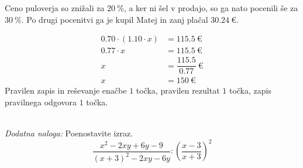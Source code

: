 \documentclass[addpoints]{exam}
\begin{document}
\begin{questions}
        \question
        Ceno puloverja so znižali za $20~\%$, a ker ni šel v prodajo, so ga nato pocenili še za $30~\%$.
        Po drugi pocenitvi ga je kupil Matej in zanj plačal $30.24~\euro$.


        \begin{solution}[1cm]
            \begin{align*}
                0.70\cdot \left(1.10\cdot x\right) &=115.5~\euro \\
                                     0.77 \cdot x &= 115.5~\euro \\
                                                x &= \dfrac{115.5}{0.77}~\euro \\
                                                x &= 150~\euro
            \end{align*}
            Pravilen zapis in reševanje enačbe $1$ točka, pravilen rezultat $1$ točka, zapis pravilnega odgovora $1$ točka.
        \end{solution}
     ~\\

\newpage
    \bonusquestion[4]
    \textit{Dodatna naloga:} Poenostavite izraz. $$ \dfrac{x^2-2xy+6y-9}{(x+3)^2-2xy-6y}:\left(\dfrac{x-3}{x+3}\right)^2 $$


\end{questions}
\end{document}
